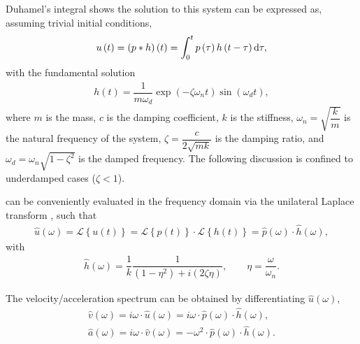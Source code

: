Duhamel's integral shows the solution to this system can be expressed as, assuming trivial initial conditions,
\begin{gather}\label{eq:duhamel}
u\left(t\right)=\left(p*h\right)\left(t\right)=\int_{0}^{t}p\left(\tau\right)h\left(t-\tau\right)\mathrm{d}\tau,
\end{gather}
with the fundamental solution
\begin{gather}
h\left(t\right)=\dfrac{1}{m\omega_d}\exp\left(-\zeta\omega_nt\right)\sin\left(\omega_dt\right),
\end{gather}
where $m$ is the mass, $c$ is the damping coefficient, $k$ is the stiffness, $\omega_n=\sqrt{\dfrac{k}{m}}$ is the natural frequency of the system, $\zeta=\dfrac{c}{2\sqrt{mk}}$ is the damping ratio, and $\omega_d=\omega_n\sqrt{1-\zeta^2}$ is the damped frequency. The following discussion is confined to underdamped cases ($\zeta<1$).

 can be conveniently evaluated in the frequency domain via the unilateral Laplace transform \citep[see, e.g.,][]{Lee1990}, such that
\begin{gather}
\hat{u}\left(\omega\right)=\mathscr{L}\left\{u\left(t\right)\right\}=\mathscr{L}\left\{p\left(t\right)\right\}\cdot\mathscr{L}\left\{h\left(t\right)\right\}=\hat{p}\left(\omega\right)\cdot\hat{h}\left(\omega\right),
\end{gather}
with
\begin{gather}\label{eq:analytical_transfer}
\hat{h}\left(\omega\right)=\dfrac{1}{k}\dfrac{1}{\left(1-\eta^2\right)+i\left(2\zeta\eta\right)},\qquad\eta=\dfrac{\omega}{\omega_n}.
\end{gather}

The velocity/acceleration spectrum can be obtained by differentiating $\hat{u}\left(\omega\right)$,
\begin{gather}
\hat{v}\left(\omega\right)=i\omega\cdot{}\hat{u}\left(\omega\right)=i\omega\cdot{}\hat{p}\left(\omega\right)\cdot\hat{h}\left(\omega\right),\\
\hat{a}\left(\omega\right)=i\omega\cdot{}\hat{v}\left(\omega\right)=-\omega^2\cdot{}\hat{p}\left(\omega\right)\cdot\hat{h}\left(\omega\right).
\end{gather}
